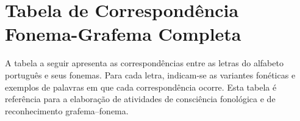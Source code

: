 
\appendix


\chapter{Tabela de Correspondência Fonema-Grafema Completa}

A tabela a seguir apresenta as correspondências entre as letras do
alfabeto português e seus fonemas. Para cada letra, indicam-se as
variantes fonéticas e exemplos de palavras em que cada correspon­dência
ocorre. Esta tabela é referência para a elaboração de atividades de
consciência fonológica e de reconhecimento grafema--fonema.

